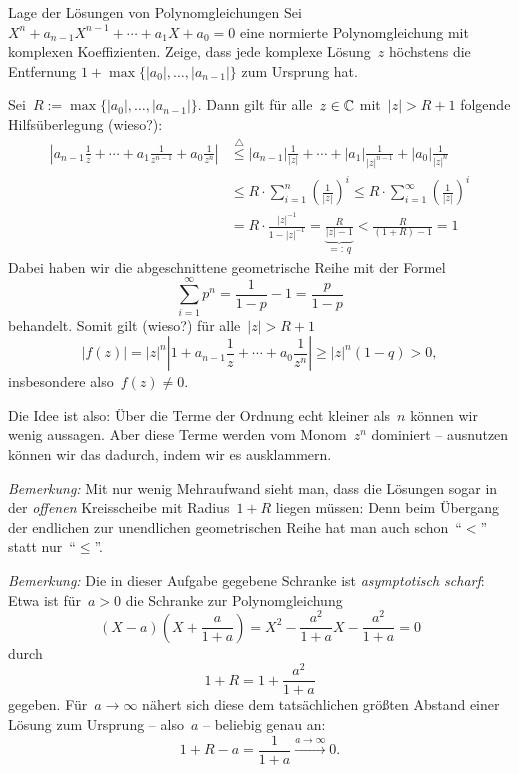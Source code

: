 \documentclass{algblatt}
\begin{document}
\vspace*{-1.5cm}

\begin{aufgabe}{Lage der Lösungen von Polynomgleichungen}
Sei $X^n + a_{n - 1} X^{n - 1} + \cdots + a_1 X + a_0 = 0$ eine normierte
Polynomgleichung mit komplexen Koeffizienten. Zeige, dass jede komplexe
Lösung~$z$ höchstens die Entfernung
$1+\max\{|a_0|,\ldots,|a_{n-1}|\}$ zum Ursprung hat.
\begin{loesung}
Sei~$R := \max\{|a_0|,\ldots,|a_{n-1}|\}$. Dann gilt für
alle~$z \in \mathbb{C}$ mit~$|z| > R + 1$ folgende Hilfsüberlegung (wieso?):
\begin{align*}
  \left|a_{n-1} \frac{1}{z} + \cdots + a_1 \frac{1}{z^{n-1}} + a_0
  \frac{1}{z^n}\right| &\stackrel{\triangle}{\leq}
  |a_{n-1}| \frac{1}{|z|} + \cdots + |a_1| \frac{1}{|z|^{n-1}} + |a_0|
  \frac{1}{|z|^n} \\
  &\leq R \cdot \sum_{i=1}^n \left(\frac{1}{|z|}\right)^i
  \leq R \cdot \sum_{i=1}^\infty \left(\frac{1}{|z|}\right)^i \\
  &= R \cdot \frac{|z|^{-1}}{1 - |z|^{-1}} =
  \underbrace{\frac{R}{|z| - 1}}_{=:\,q} < \frac{R}{(1+R)-1} = 1
\end{align*}
Dabei haben wir die abgeschnittene geometrische Reihe mit der Formel
\[ \sum_{i=1}^\infty p^n = \frac{1}{1 - p} - 1 =
  \frac{p}{1-p} \]
behandelt. Somit gilt (wieso?) für alle~$|z| > R + 1$
\[ |f(z)| = |z|^n \left|1 + a_{n-1} \frac{1}{z} + \cdots + a_0 \frac{1}{z^n}\right|
  \geq |z|^n \left(1 - q\right) > 0, \]
insbesondere also~$f(z) \neq 0$.

Die Idee ist also: Über die Terme der Ordnung echt kleiner als~$n$ können wir
wenig aussagen. Aber diese Terme werden vom Monom~$z^n$ dominiert -- ausnutzen
können wir das dadurch, indem wir es ausklammern.

\emph{Bemerkung:} Mit nur wenig Mehraufwand sieht man, dass die Lösungen sogar
in der \emph{offenen} Kreisscheibe mit Radius~$1 + R$ liegen müssen: Denn beim
Übergang der endlichen zur unendlichen geometrischen Reihe hat man auch
schon~"`$<$"' statt nur~"`$\leq$"'.

\emph{Bemerkung:} Die in dieser Aufgabe gegebene Schranke ist \emph{asymptotisch
scharf}: Etwa ist für~$a > 0$ die Schranke zur Polynomgleichung
\[ \left(X - a\right) \left(X + \frac{a}{1+a}\right) =
  X^2 - \frac{a^2}{1 + a} X - \frac{a^2}{1+a} = 0 \]
durch
\[ 1 + R = 1 + \frac{a^2}{1 + a} \]
gegeben. Für~$a \to \infty$ nähert sich diese dem tatsächlichen größten
Abstand einer Lösung zum Ursprung -- also~$a$ -- beliebig genau an:
\[ 1 + R - a = \frac{1}{1 + a} \xrightarrow{a \to \infty} 0. \]
\end{loesung}
\end{aufgabe}
\end{document}
